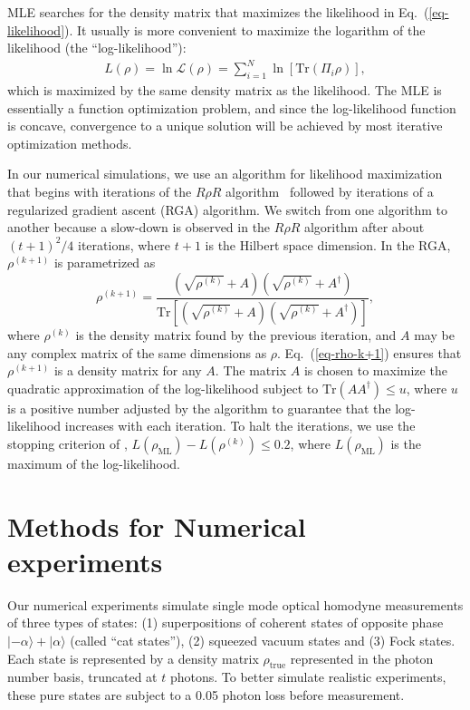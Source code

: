 \documentclass[
reprint,
superscriptaddress,
showpacs,
amsmath,
amssymb,
aps,
pra,
longbibliography
]{revtex4-1}
\begin{document}
MLE searches for the density matrix that maximizes the likelihood
in Eq.~(\ref{eq-likelihood}). It usually is
more convenient to maximize the logarithm of the likelihood (the
``log-likelihood''):
\begin{eqnarray}
  L (\rho) = \ln \mathcal{L} (\rho)= \sum_{i=1}^{N} \ln [\mathrm{Tr} (\Pi_i \rho)],
\end{eqnarray} 
which is maximized by the same density matrix as the likelihood. The
MLE is essentially a function optimization problem, and since the
log-likelihood function is concave, convergence to a unique solution
will be achieved by most iterative optimization methods.

In our numerical simulations, we use an algorithm for likelihood
maximization that begins with iterations of the $R\rho R$
algorithm~\cite{Rehacek2007} followed by iterations of a regularized
gradient ascent (RGA) algorithm. We switch from one algorithm to another 
because a slow-down is observed in the $R\rho R$ algorithm
after about $(t+1)^2/4$ iterations, where $t+1$ is the Hilbert
  space dimension. In the RGA, $\rho^{(k+1)}$ is parametrized as
\begin{equation}
  \rho^{(k+1)}=\frac{\left(\sqrt{\rho^{(k)}}+A\right)\left(\sqrt{\rho^{(k)}}+A^{\dagger}\right)}{\mathrm{Tr}\left[\left(\sqrt{\rho^{(k)}}+A\right)\left(\sqrt{\rho^{(k)}}+A^{\dagger}\right)\right]},
  \label{eq-rho-k+1}
\end{equation}
where $\rho^{(k)}$ is the density matrix found by the previous
iteration, and $A$ may be any complex matrix of the same dimensions as
$\rho$. Eq.~(\ref{eq-rho-k+1}) ensures that $\rho^{(k+1)}$ is a
density matrix for any $A$. The matrix $A$ is chosen to maximize the
quadratic approximation of the log-likelihood subject to
$\text{Tr}(AA^{\dagger})\leq u$, where $u$ is a positive number
adjusted by the algorithm to guarantee that the log-likelihood
increases with each iteration. To halt the iterations, we use the
stopping criterion of \cite{Glancy2012},
$L(\rho_{\text{ML}})-L(\rho^{(k)})\leq 0.2$, where
$L(\rho_{\text{ML}})$ is the maximum of the log-likelihood.



\section{Methods for Numerical experiments}
\label{numerical-experiments}
Our numerical experiments simulate single mode optical
homodyne measurements of three types of states: (1) superpositions of coherent states of opposite phase $|-\alpha\rangle + |\alpha\rangle$ (called ``cat states''), (2) squeezed vacuum states and (3) Fock states.  
Each state is represented by a density matrix $\rho_{\mathrm{true}}$ 
represented in the photon number basis, truncated at $t$ photons. To better simulate realistic experiments, these pure states are subject to a 0.05 
photon loss before measurement. 
\end{document}
